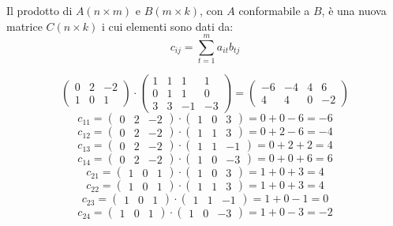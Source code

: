 \begin{definition}
  Il prodotto di $A\left( n\times m \right)$ e $B\left( m\times k \right)$, con $A$ conformabile a $B$, è una nuova matrice $C\left( n\times k \right)$ i cui elementi sono dati da:
  $$c_{ij}=\sum_{t=1}^ma_{it}b_{tj}$$
\end{definition}
\begin{example}
  $$
    \begin{pmatrix}
      0 & 2 & -2 \\
      1 & 0 & 1  
    \end{pmatrix}
    \cdot
    \begin{pmatrix}
      1 & 1 & 1  & 1  \\
      0 & 1 & 1  & 0  \\
      3 & 3 & -1 & -3 
    \end{pmatrix}
    =
    \begin{pmatrix}
      -6 & -4 & 4 & 6  \\
      4  & 4  & 0 & -2 
    \end{pmatrix}
  $$
  $$c_{11}=\begin{pmatrix}0&2&-2\end{pmatrix}\cdot\begin{pmatrix}1&0&3\end{pmatrix}=0+0-6=-6$$
  $$c_{12}=\begin{pmatrix}0&2&-2\end{pmatrix}\cdot\begin{pmatrix}1&1&3\end{pmatrix}=0+2-6=-4$$
  $$c_{13}=\begin{pmatrix}0&2&-2\end{pmatrix}\cdot\begin{pmatrix}1&1&-1\end{pmatrix}=0+2+2=4$$
  $$c_{14}=\begin{pmatrix}0&2&-2\end{pmatrix}\cdot\begin{pmatrix}1&0&-3\end{pmatrix}=0+0+6=6$$
  $$c_{21}=\begin{pmatrix}1&0&1\end{pmatrix}\cdot\begin{pmatrix}1&0&3\end{pmatrix}=1+0+3=4$$
  $$c_{22}=\begin{pmatrix}1&0&1\end{pmatrix}\cdot\begin{pmatrix}1&1&3\end{pmatrix}=1+0+3=4$$
  $$c_{23}=\begin{pmatrix}1&0&1\end{pmatrix}\cdot\begin{pmatrix}1&1&-1\end{pmatrix}=1+0-1=0$$
  $$c_{24}=\begin{pmatrix}1&0&1\end{pmatrix}\cdot\begin{pmatrix}1&0&-3\end{pmatrix}=1+0-3=-2$$
\end{example}